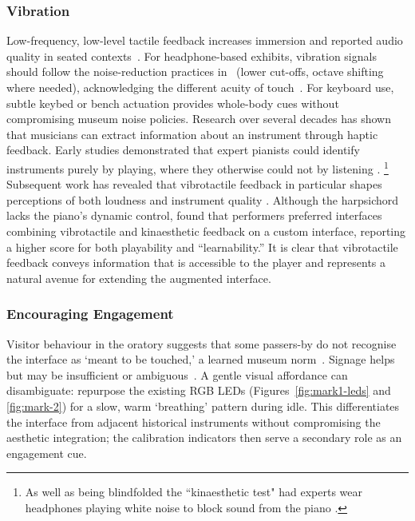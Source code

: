 \subsubsection{Vibration}

Low-frequency, low-level tactile feedback increases immersion and reported audio
quality in seated
contexts~\cite{merchel_vibratory_2009,merchel_functional_2018}. For
headphone-based exhibits, vibration signals should follow the noise-reduction
practices in~\textcite{merchel_functional_2018} (lower cut-offs, octave shifting
where needed), acknowledging the different acuity of
touch~\cite{summers_single_2000}. For keyboard use, subtle keybed or bench
actuation provides whole-body cues without compromising museum noise policies.%
Research over several decades has shown that musicians can extract information
about an instrument through haptic feedback. Early studies demonstrated that
expert pianists could identify instruments purely by playing, where they
otherwise could not by listening
\cite{galembo_quality_1982,galembo_problem_1983}.
\footnote{As well as being blindfolded the ``kinaesthetic test" had experts
wear headphones playing white noise to block sound from the piano
\cite{galembo_quality_2003}.} Subsequent work has revealed that vibrotactile
feedback in particular shapes perceptions of both
loudness \cite{fontana_perception_2018} and instrument quality
\cite{fluckiger_influence_2018}. Although the harpsichord lacks the piano's
dynamic control, \textcite{young_musical_2018} found that performers preferred
interfaces combining vibrotactile and kinaesthetic feedback on a custom
interface, reporting a higher score for both playability and ``learnability.''
It is clear that vibrotactile feedback conveys information that is accessible to the
player and represents a natural avenue for extending the augmented interface.

\subsubsection{Encouraging Engagement}

Visitor behaviour in the oratory suggests that some passers-by do not recognise the interface as `meant to be touched,' a learned museum norm~\cite{howes_introduction_2014,classen_touch_2005}. Signage helps but may be insufficient or ambiguous~\cite{khalifa_visitors_2025}. A gentle visual affordance can disambiguate: repurpose the existing RGB LEDs (Figures~\ref{fig:mark1-leds} and \ref{fig:mark-2}) for a slow, warm `breathing' pattern during idle. This differentiates the interface from adjacent historical instruments without compromising the aesthetic integration; the calibration indicators then serve a secondary role as an engagement cue.

